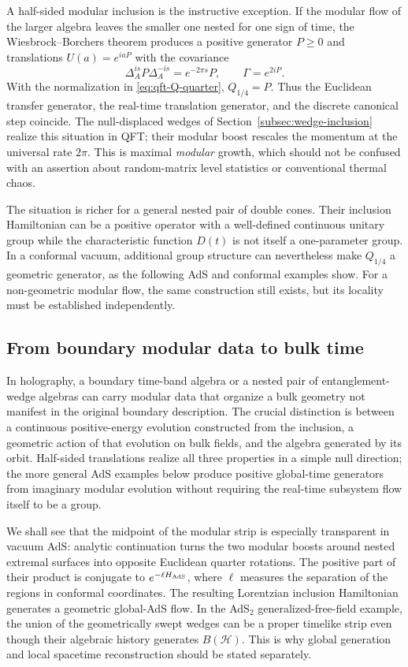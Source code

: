 \documentclass[a4paper,11pt]{article}
\theoremstyle{definition}
\begin{document}
A half-sided modular inclusion is the instructive exception. If the modular flow of the larger algebra leaves the smaller one nested for one sign of time, the Wiesbrock--Borchers theorem produces a positive generator $P\ge0$ and translations $U(a)=e^{iaP}$ with the covariance
\begin{equation}
 \Delta_A^{is}P\Delta_A^{-is}=e^{-2\pi s}P,
 \qquad \Gamma=e^{2iP}.
 \label{eq:qft-Borchers-time}
\end{equation}
With the normalization in \eqref{eq:qft-Q-quarter}, $Q_{1/4}=P$. Thus the Euclidean transfer generator, the real-time translation generator, and the discrete canonical step coincide. The null-displaced wedges of Section~\ref{subsec:wedge-inclusion} realize this situation in QFT; their modular boost rescales the momentum at the universal rate $2\pi$. This is maximal \emph{modular} growth, which should not be confused with an assertion about random-matrix level statistics or conventional thermal chaos.

The situation is richer for a general nested pair of double cones. Their inclusion Hamiltonian can be a positive operator with a well-defined continuous unitary group while the characteristic function $D(t)$ is not itself a one-parameter group. In a conformal vacuum, additional group structure can nevertheless make $Q_{1/4}$ a geometric generator, as the following AdS and conformal examples show. For a non-geometric modular flow, the same construction still exists, but its locality must be established independently.

\subsection{From boundary modular data to bulk time}
\label{subsec:qft-bulk-time}

In holography, a boundary time-band algebra or a nested pair of entanglement-wedge algebras can carry modular data that organize a bulk geometry not manifest in the original boundary description. The crucial distinction is between a continuous positive-energy evolution constructed from the inclusion, a geometric action of that evolution on bulk fields, and the algebra generated by its orbit. Half-sided translations realize all three properties in a simple null direction; the more general AdS examples below produce positive global-time generators from imaginary modular evolution without requiring the real-time subsystem flow itself to be a group.

We shall see that the midpoint of the modular strip is especially transparent in vacuum AdS: analytic continuation turns the two modular boosts around nested extremal surfaces into opposite Euclidean quarter rotations. The positive part of their product is conjugate to $e^{-\ell H_{\rm AdS}}$, where $\ell$ measures the separation of the regions in conformal coordinates. The resulting Lorentzian inclusion Hamiltonian generates a geometric global-AdS flow. In the AdS$_2$ generalized-free-field example, the union of the geometrically swept wedges can be a proper timelike strip even though their algebraic history generates $B(\mathcal H)$. This is why global generation and local spacetime reconstruction should be stated separately.
\end{document}
